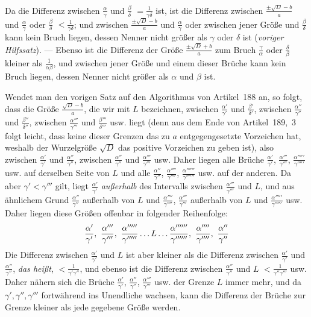 Da die Differenz zwischen $\frac{\alpha}{\gamma}$ und $\frac{\beta}{\delta}$ $=\frac{1}{\gamma\delta}$ ist, ist die Differenz zwischen $\frac{\pm\surd D-b}{a}$ und $\frac{\alpha}{\gamma}$ oder $\frac{\beta}{\delta}$ $<\frac{1}{\gamma\delta}$; und zwischen $\frac{\pm\surd D-b}{a}$ und $\frac{\alpha}{\gamma}$ oder zwischen jener Größe und $\frac{\beta}{\delta}$ kann kein Bruch liegen, dessen Nenner nicht größer als $\gamma$ oder $\delta$ ist (\textit{voriger Hilfssatz}). --- Ebenso ist die Differenz der Größe ${\frac{\pm\surd D+b}{a}}$ zum Bruch $\frac{\gamma}{\alpha}$ oder $\frac{\delta}{\beta}$
kleiner als $\frac{1}{\alpha\beta}$, und zwischen jener Größe und einem dieser Brüche kann kein Bruch liegen, dessen Nenner nicht größer als $\alpha$ und $\beta$ ist.

Wendet man den vorigen Satz auf den Algorithmus von Artikel~188 an, so folgt, dass die Größe $\frac{\surd D-b}{a}$, die wir mit $L$ bezeichnen, zwischen $\frac{\alpha'}{\gamma'}$ und $\frac{\beta'}{\delta'}$, zwischen $\frac{\alpha''}{\gamma''}$ und $\frac{\beta''}{\delta''}$, zwischen $\frac{\alpha'''}{\gamma'''}$ und $\frac{\beta'''}{\delta'''}$ usw. liegt (denn aus dem Ende von Artikel~189,~3 folgt leicht, dass keine dieser Grenzen das zu $a$ entgegengesetzte Vorzeichen hat, weshalb der Wurzelgröße $\surd D$ das positive Vorzeichen zu geben ist), also zwischen $\frac{\alpha'}{\gamma'}$ und $\frac{\alpha''}{\gamma''}$, zwischen $\frac{\alpha''}{\gamma''}$ und $\frac{\alpha'''}{\gamma'''}$ usw. Daher liegen alle Brüche $\frac{\alpha'}{\gamma'}$, $\frac{\alpha'''}{\gamma'''}$, $\frac{\alpha'''''}{\gamma'''''}$ usw. auf derselben Seite von $L$ und alle $\frac{\alpha''}{\gamma''}$, $\frac{\alpha''''}{\gamma''''}$, $\frac{\alpha''''''}{\gamma''''''}$ usw. auf der anderen. Da aber $\gamma'<\gamma'''$ gilt, liegt $\frac{\alpha'}{\gamma'}$ \textit{außerhalb} des Intervalls zwischen $\frac{\alpha'''}{\gamma'''}$ und $L$, und aus ähnlichem Grund $\frac{\alpha''}{\gamma''}$ außerhalb von $L$ und $\frac{\alpha''''}{\gamma''''}$, $\frac{\alpha'''}{\gamma'''}$ außerhalb von $L$ und $\frac{\alpha'''''}{\gamma'''''}$ usw. Daher liegen diese Größen offenbar in folgender Reihenfolge:
\[
\frac{\alpha'}{\gamma'},\ \frac{\alpha'''}{\gamma'''},\ \frac{\alpha'''''}{\gamma'''''}\mathinner{\ldotp\ldotp\ldotp} L\mathinner{\ldotp\ldotp\ldotp}\frac{\alpha''''''}{\gamma''''''},\ \frac{\alpha''''}{\gamma''''},\ \frac{\alpha''}{\gamma''}
\]
Die Differenz zwischen $\frac{\alpha'}{\gamma'}$ und $L$ ist aber kleiner als die Differenz zwischen $\frac{\alpha'}{\gamma'}$ und $\frac{\alpha''}{\gamma''}$, \textit{das heißt}, $<\frac{1}{\gamma'\gamma''}$, und ebenso ist die Differenz zwischen $\frac{\alpha''}{\gamma''}$ und $L$ $<\frac{1}{\gamma''\gamma'''}$ usw. Daher nähern sich die Brüche $\frac{\alpha'}{\gamma'}$, $\frac{\alpha''}{\gamma''}$, $\frac{\alpha'''}{\gamma'''}$ usw. der Grenze $L$ immer mehr, und da $\gamma',\gamma'',\gamma'''$ fortwährend ins Unendliche wachsen, kann die Differenz der Brüche zur Grenze kleiner als jede gegebene Größe werden.

